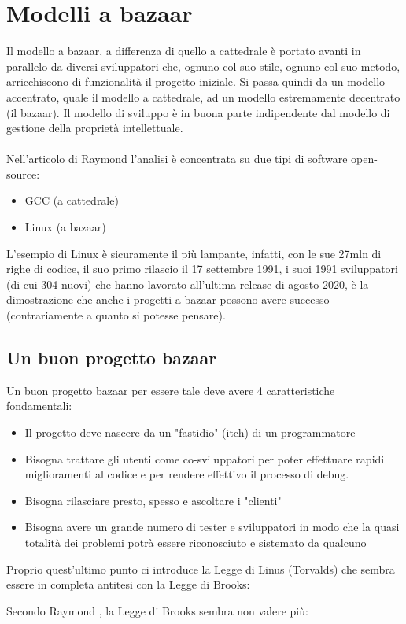 \section{Modelli a bazaar}
Il modello a bazaar, a differenza di quello a cattedrale è portato avanti in parallelo da diversi sviluppatori che, ognuno col suo stile, ognuno col suo metodo, arricchiscono di funzionalità il progetto iniziale. Si passa quindi da un modello accentrato, quale il modello a cattedrale, ad un modello estremamente decentrato (il bazaar). Il modello di sviluppo è in buona parte indipendente dal modello di gestione della proprietà intellettuale.\\\\
Nell'articolo di Raymond \cite{catbazaar} l'analisi è concentrata su due tipi di software open-source:
\begin{itemize}
    \item GCC (a cattedrale)
    \item Linux (a bazaar)
\end{itemize}
L'esempio di Linux è sicuramente il più lampante, infatti, con le sue 27mln di righe di codice, il suo primo rilascio il 17 settembre 1991, i suoi 1991 sviluppatori (di cui 304 nuovi) che hanno lavorato all'ultima release di agosto 2020, è la dimostrazione che anche i progetti a bazaar possono avere successo (contrariamente a quanto si potesse pensare). 

\subsection{Un buon progetto bazaar}
Un buon progetto bazaar per essere tale deve avere 4 caratteristiche fondamentali:
\begin{itemize}
    \item Il progetto deve nascere da un "fastidio" (itch) di un programmatore
    \item Bisogna trattare gli utenti come co-sviluppatori per poter effettuare rapidi miglioramenti al codice e per rendere effettivo il processo di debug.
    \item Bisogna rilasciare presto, spesso e ascoltare i "clienti"\
    \item Bisogna avere un grande numero di tester e sviluppatori in modo che la quasi totalità dei problemi potrà essere riconosciuto e sistemato da qualcuno
\end{itemize}
Proprio quest'ultimo punto ci introduce la Legge di Linus (Torvalds) che sembra essere in completa antitesi con la Legge di Brooks:
\begin{center} \say{Given enough eyeballs, all bugs are shallow} \end{center}
Secondo Raymond \cite{catbazaar}, la Legge di Brooks sembra non valere più:
\clearpage
